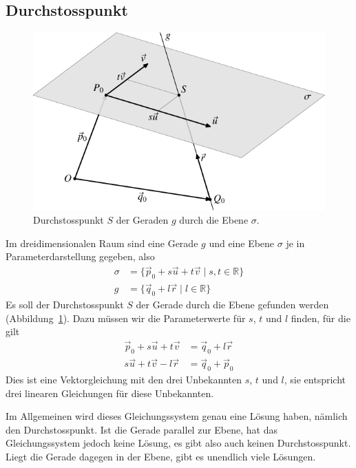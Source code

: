 \subsection{Durchstosspunkt\label{subsection-durchstosspunkt}}
\begin{figure}
\begin{center}
\includegraphics{images/v-9}
\end{center}
\caption{Durchstosspunkt $S$ der Geraden $g$ durch die Ebene
$\sigma$.\label{image-durchstosspunkt}}
\end{figure}
Im dreidimensionalen Raum
sind eine Gerade $g$ und eine Ebene $\sigma$ je in Parameterdarstellung gegeben, also
\begin{align*}
\sigma&=
\{
\vec p_0+s\vec u+t\vec v\;
|\;s, t\in\mathbb R\}
\\
g&=
\{
\vec q_0+l\vec r\;
|\;l\in\mathbb R
\}
\end{align*}
Es soll der Durchstosspunkt $S$ der Gerade durch die Ebene gefunden
werden (Abbildung~\ref{image-durchstosspunkt}).
Dazu müssen wir die Parameterwerte für $s$, $t$ und $l$ finden,
für die gilt
\begin{align*}
\vec p_0+s\vec u+t\vec v
&=
\vec q_0+l\vec r
\\
s\vec u+t\vec v-l\vec r&=\vec q_0+\vec p_0
\end{align*}
Dies ist eine Vektorgleichung mit den drei Unbekannten $s$, $t$ und $l$,
sie entspricht drei linearen Gleichungen für diese Unbekannten.

Im Allgemeinen wird dieses Gleichungssystem genau eine Lösung haben,
nämlich den Durchstosspunkt.
Ist die Gerade parallel zur Ebene, hat das Gleichungssystem jedoch keine
Lösung, es gibt also auch keinen Durchstosspunkt.
Liegt die Gerade dagegen in der Ebene, gibt es unendlich viele Lösungen.


